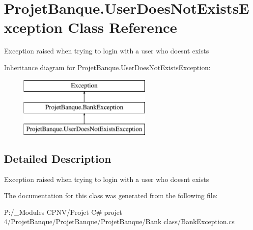 \hypertarget{class_projet_banque_1_1_user_does_not_exists_exception}{}\section{Projet\+Banque.\+User\+Does\+Not\+Exists\+Exception Class Reference}
\label{class_projet_banque_1_1_user_does_not_exists_exception}


Exception raised when trying to login with a user who doesn\textquotesingle{}t exists  


Inheritance diagram for Projet\+Banque.\+User\+Does\+Not\+Exists\+Exception\+:\begin{figure}[H]
\begin{center}
\leavevmode
\includegraphics[height=3.000000cm]{class_projet_banque_1_1_user_does_not_exists_exception}
\end{center}
\end{figure}


\subsection{Detailed Description}
Exception raised when trying to login with a user who doesn\textquotesingle{}t exists 



The documentation for this class was generated from the following file\+:\begin{DoxyCompactItemize}
\item 
P\+:/\+\_\+\+Modules C\+P\+N\+V/\+Projet C\# projet 4/\+Projet\+Banque/\+Projet\+Banque/\+Projet\+Banque/\+Bank class/Bank\+Exception.\+cs\end{DoxyCompactItemize}

